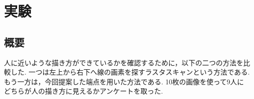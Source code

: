 \chapter{実験}
  \label{chap:experiment}
  \section{概要}
    \label{sec:summary}
	人に近いような描き方ができているかを確認するために，以下の二つの方法を比較した.
	一つは左上から右下へ線の画素を探すラスタスキャンという方法である. もう一方は，今回提案した端点を用いた方法である. 10枚の画像を使って9人にどちらが人の描き方に見えるかアンケートを取った.

